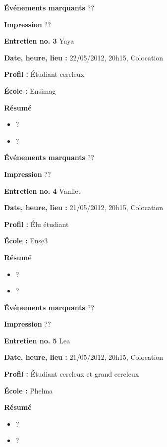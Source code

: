 \documentclass[a4paper, 11px]{article}
\begin{document}
\textbf{Événements marquants}
??

\textbf{Impression}
??



\vspace{.3cm}

 \textbf {\large Entretien no. 3}
Yaya

\textbf{Date, heure, lieu : }
22/05/2012, 20h15, Colocation

\textbf{Profil : }
Étudiant cercleux

\textbf{École : }
Ensimag

\textbf{Résumé}
	\begin{itemize}
		\item ?
		\item ?
	\end{itemize}

\textbf{Événements marquants}
??

\textbf{Impression}
??



\vspace{.3cm}

 \textbf {\large Entretien no. 4}
Vanflet

\textbf{Date, heure, lieu : }
21/05/2012, 20h15, Colocation

\textbf{Profil : }
Élu étudiant

\textbf{École : }
Ense3

\textbf{Résumé}
	\begin{itemize}
		\item ?
		\item ?
	\end{itemize}

\textbf{Événements marquants}
??

\textbf{Impression}
??



\vspace{.3cm}

 \textbf {\large Entretien no. 5}
Lea

\textbf{Date, heure, lieu : }
21/05/2012, 20h15, Colocation

\textbf{Profil : }
Étudiant cercleux et grand cercleux


\textbf{École : }
Phelma

\textbf{Résumé}
	\begin{itemize}
		\item ?
		\item ?
	\end{itemize}
\end{document}
